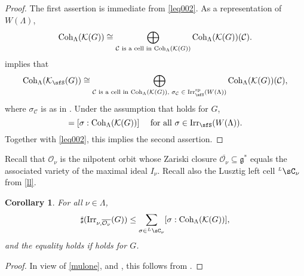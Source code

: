 \documentclass[12pt]{amsart}
\def\subset{\subseteq}
\newcommand{\CC}{{\mathcal {C}}}
\newcommand{\CK}{{\mathcal {K}}}
\newcommand{\CO}{{\mathcal {O}}}
\newcommand{\g}{\mathfrak g}
\numberwithin{equation}{section}
\newtheorem{cor}[thm]{Corollary}
\theoremstyle{remark}
\def\Irr{\mathrm{Irr}}
\def\LC{{}^{\scriptscriptstyle L}\sC}
\def\Coh{\mathrm{Coh}}
\newcommand{\Lam}{{[\lambda]}}
\begin{document}
\begin{proof} The first assertion is immediate from \eqref{leq002}.
As a  representation of $W(\Lambda)$,
\[
  \Coh_{\Lambda}(\CK(G))\\
   \cong \bigoplus_{\CC \textrm{ is a cell in $\Coh_{\Lambda}(\CK(G))$}} \Coh_{\Lambda}(\CK(G))(\CC).
\]
 implies that
 \[
   \Coh_{\Lambda}(\CK_\sfS(G))\cong  \bigoplus_{\CC \textrm{ is a cell in $\Coh_{\Lambda}(\CK(G))$, $\sigma_\CC\in \Irr^{\mathrm{sp}}_\sfS(W(\Lambda))$}} \Coh_{\Lambda}(\CK(G))(\CC),
 \]
 where $\sigma_\CC$ is as in . Under the assumption that  holds for $G$,
\begin{equation*}%
[ \sigma: \Coh_{\Lambda}(\CK_\sfS(G))]=[\sigma:\Coh_{\Lambda}(\CK(G))]\quad \textrm{ for all  $\sigma\in \Irr_\sfS(W(\Lambda))$.}
\end{equation*}
Together with \eqref{leq002}, this implies the second assertion.
\end{proof}


 Recall that $\CO_\nu $ is the nilpotent orbit
 whose Zariski closure $\overline{\CO_{\nu}}\subset \g^*$ equals
 the associated variety of the maximal ideal $I_\nu$. Recall also the Lusztig left cell
$\LC_{\nu}$ from \eqref{ll}.




 \begin{cor}\label{countleq}
   For  all $\nu\in \Lambda$,
  \begin{equation*}%
    \sharp(\Irr_{\nu,\overline{\CO_{\nu}}}(G)) \leq \sum_{\sigma \in \LC_{\nu}}   [\sigma:\Coh_{\Lambda}(\CK(G))],
  \end{equation*}
     and the equality holds if   holds for $G$.
    \end{cor}
  \begin{proof}
 In view of \eqref{mulone},  and , this follows from .  \end{proof}
\end{document}
